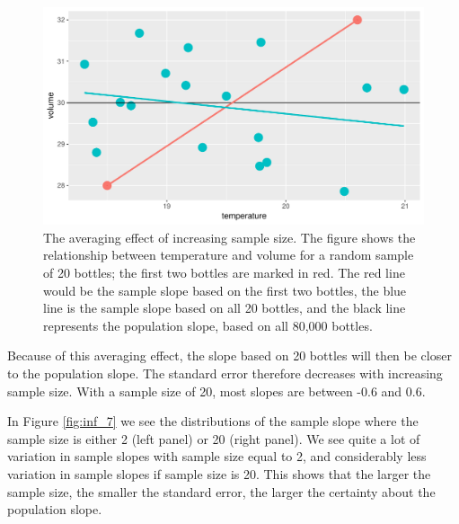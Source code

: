\documentclass[]{report}\usepackage[]{graphicx}\usepackage[]{color}
\makeatletter
\def\maxwidth{ %
  \ifdim\Gin@nat@width>\linewidth
    \linewidth
  \else
    \Gin@nat@width
  \fi
}
\makeatother
\begin{document}
\begin{figure}

{\centering \includegraphics[width=\maxwidth]{figure/fig_samplesize20-1} 

}

\caption[The averaging effect of increasing sample size]{The averaging effect of increasing sample size. The figure shows the relationship between temperature and volume for a random sample of 20 bottles; the first two bottles are marked in red. The red line would be the sample slope based on the first two bottles, the blue line is the sample slope based on all 20 bottles, and the black line represents the population slope, based on all 80,000 bottles.}\label{fig:fig_samplesize20}
\end{figure}




Because of this averaging effect, the slope based on 20 bottles will then be closer to the population slope. The standard error therefore decreases with increasing sample size. With a sample size of 20, most slopes are between -0.6 and 0.6.

In Figure \ref{fig:inf_7} we see the distributions of the sample slope where the sample size is either 2 (left panel) or 20 (right panel). We see quite a lot of variation in sample slopes with sample size equal to 2, and considerably less variation in sample slopes if sample size is 20. This shows that the larger the sample size, the smaller the standard error, the larger the certainty about the population slope. 
\end{document}
